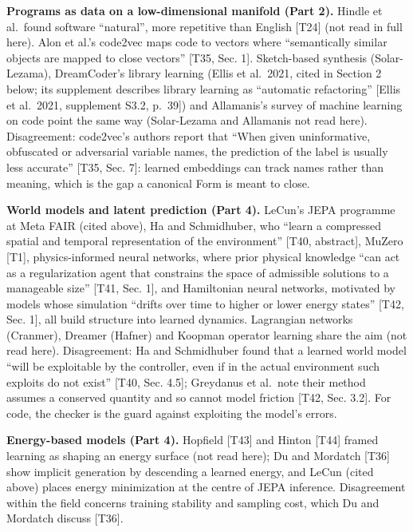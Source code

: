 \documentclass[10pt,letterpaper]{article}
\begin{document}
\textbf{Programs as data on a low-dimensional manifold (Part 2).} Hindle
et al.~found software ``natural'', more repetitive than English
{[}T24{]} (not read in full here). Alon et al.'s code2vec maps code to
vectors where ``semantically similar objects are mapped to close
vectors'' {[}T35, Sec. 1{]}. Sketch-based synthesis (Solar-Lezama),
DreamCoder's library learning (Ellis et al.~2021, cited in Section 2
below; its supplement describes library learning as ``automatic
refactoring'' {[}Ellis et al.~2021, supplement S3.2, p.~39{]}) and
Allamanis's survey of machine learning on code point the same way
(Solar-Lezama and Allamanis not read here). Disagreement: code2vec's
authors report that ``When given uninformative, obfuscated or
adversarial variable names, the prediction of the label is usually less
accurate'' {[}T35, Sec. 7{]}: learned embeddings can track names rather
than meaning, which is the gap a canonical Form is meant to close.

\textbf{World models and latent prediction (Part 4).} LeCun's JEPA
programme at Meta FAIR (cited above), Ha and Schmidhuber, who ``learn a
compressed spatial and temporal representation of the environment''
{[}T40, abstract{]}, MuZero {[}T1{]}, physics-informed neural networks,
where prior physical knowledge ``can act as a regularization agent that
constrains the space of admissible solutions to a manageable size''
{[}T41, Sec. 1{]}, and Hamiltonian neural networks, motivated by models
whose simulation ``drifts over time to higher or lower energy states''
{[}T42, Sec. 1{]}, all build structure into learned dynamics. Lagrangian
networks (Cranmer), Dreamer (Hafner) and Koopman operator learning share
the aim (not read here). Disagreement: Ha and Schmidhuber found that a
learned world model ``will be exploitable by the controller, even if in
the actual environment such exploits do not exist'' {[}T40, Sec. 4.5{]};
Greydanus et al.~note their method assumes a conserved quantity and so
cannot model friction {[}T42, Sec. 3.2{]}. For code, the checker is the
guard against exploiting the model's errors.

\textbf{Energy-based models (Part 4).} Hopfield {[}T43{]} and Hinton
{[}T44{]} framed learning as shaping an energy surface (not read here);
Du and Mordatch {[}T36{]} show implicit generation by descending a
learned energy, and LeCun (cited above) places energy minimization at
the centre of JEPA inference. Disagreement within the field concerns
training stability and sampling cost, which Du and Mordatch discuss
{[}T36{]}.
\end{document}
